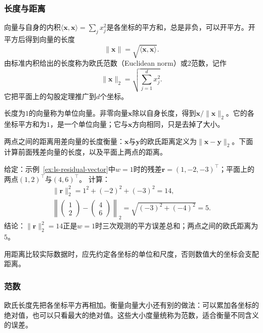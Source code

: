 \subsubsection{长度与距离}
\label{sec:linear-algebra-length-angle-distance}

向量与自身的内积$\langle\bm x,\bm x\rangle=\sum_jx_j^2$是各坐标的平方和，总是非负，可以开平方。开平方后得到向量的长度
\begin{equation}
 \lVert\bm x\rVert=\sqrt{\langle\bm x,\bm x\rangle}.
 \label{eq:linear-algebra-inner-product-norm}
\end{equation}
由标准内积给出的长度称为欧氏范数（Euclidean norm）或$2$范数，记作
\[
 \lVert\bm x\rVert_2=\sqrt{\sum_{j=1}^d x_j^2}.
\]
它把平面上的勾股定理推广到$d$个坐标。

长度为$1$的向量称为单位向量。非零向量$\bm x$除以自身长度，得到$\bm x/\lVert\bm x\rVert_2$。它的各坐标平方和为$1$，是一个单位向量；它与$\bm x$方向相同，只是去掉了大小。

两点之间的距离用差向量的长度衡量：$\bm x$与$\bm y$的欧氏距离定义为$\lVert\bm x-\bm y\rVert_2$。下面计算前面残差向量的长度，以及平面上两点的距离。
\begin{example}[长度与距离的计算]
\label{ex:ls-length-distance}
给定：示例~\ref{ex:ls-residual-vector}中$w=1$时的残差$\bm r=(1,-2,-3)^\top$；平面上的两点$(1,2)^\top$与$(4,6)^\top$。
计算：
\[
 \begin{gathered}
 \lVert\bm r\rVert_2^2=1^2+(-2)^2+(-3)^2=14,\\
 \left\lVert\begin{pmatrix}1\\2\end{pmatrix}-\begin{pmatrix}4\\6\end{pmatrix}\right\rVert_2=\sqrt{(-3)^2+(-4)^2}=5.
 \end{gathered}
\]
结论：$\lVert\bm r\rVert_2^2=14$正是$w=1$时三次观测的平方误差总和；两点之间的欧氏距离为$5$。
\end{example}
用距离比较实际数据时，应先约定各坐标的单位和尺度，否则数值大的坐标会支配距离。

\subsubsection{范数}

欧氏长度先把各坐标平方再相加。衡量向量大小还有别的做法：可以累加各坐标的绝对值，也可以只看最大的绝对值。这些大小度量统称为范数，适合衡量不同含义的误差。

